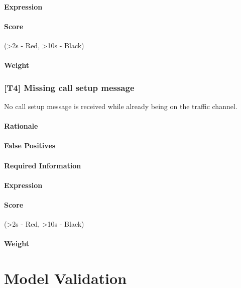 \documentclass[a4paper,11pt,notitlepage,bigheadings,oneside]{scrartcl}
\begin{document}
\TBD{}

\paragraph{Expression}

\TBD{}

\paragraph{Score}

\TBD{} (\textgreater 2s - Red, \textgreater 10s - Black)


\paragraph{Weight}

\TBD{}

\subsubsection{[T4] Missing call setup message}

No call setup message is received while already being on the traffic channel.

\paragraph{Rationale}

\TBD{}

\paragraph{False Positives}

\TBD{}

\paragraph{Required Information}

\TBD{}

\paragraph{Expression}

\TBD{}

\paragraph{Score}

\TBD{} (\textgreater 2s - Red, \textgreater 10s - Black)


\paragraph{Weight}

\TBD{}


\section{Model Validation}
\end{document}
